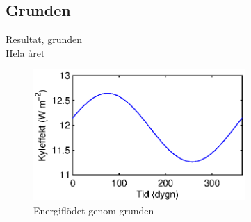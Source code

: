 \subsection{Grunden}

\begin{frame}{Resultat, grunden\\Hela året}

\begin{figure}[hpbt]
\centering
\includegraphics[height=5cm]{images/foundation.eps}
\caption*{Energiflödet genom grunden}
\end{figure}

\end{frame}